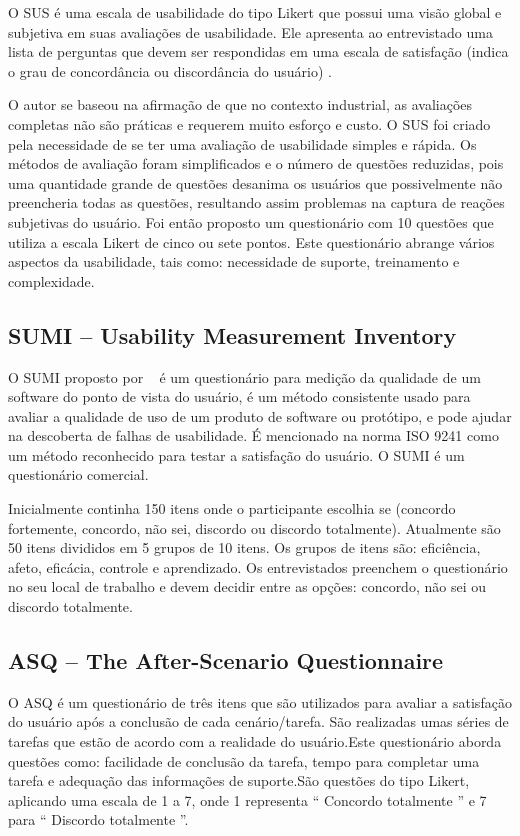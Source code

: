 	O SUS é uma escala de usabilidade do tipo Likert que possui uma visão global e subjetiva em suas avaliações de usabilidade. Ele apresenta ao entrevistado uma lista de perguntas que devem ser respondidas em uma escala de satisfação (indica o grau de concordância ou discordância do usuário) \cite{brooke1996sus}.

	O autor se baseou na afirmação de que no contexto industrial, as avaliações completas não são práticas e requerem muito esforço e custo. O SUS foi criado pela necessidade de se ter uma avaliação de usabilidade simples e rápida. Os métodos de avaliação foram simplificados e o número de questões reduzidas, pois uma quantidade grande de questões desanima os usuários que possivelmente não preencheria todas as questões, resultando assim problemas na captura de reações subjetivas do usuário. Foi então proposto um questionário com 10 questões que utiliza a escala Likert de cinco ou sete pontos. Este questionário abrange vários aspectos da usabilidade, tais como: necessidade de suporte, treinamento e complexidade. ~\cite{preece2007}

\subsection{SUMI – Usability Measurement Inventory}

	O SUMI proposto por ~ é um questionário para medição da qualidade de um software do ponto de vista do usuário, é um método consistente usado para avaliar a qualidade de uso de um produto de software ou protótipo, e pode ajudar na descoberta de falhas de usabilidade. É mencionado na norma ISO 9241 como um método reconhecido para testar a satisfação do usuário. O SUMI é um questionário comercial. 

	Inicialmente continha 150 itens onde o participante escolhia se (concordo fortemente, concordo, não sei, discordo ou discordo totalmente). Atualmente são 50 itens divididos em 5 grupos de 10 itens. Os grupos de itens são: eficiência, afeto, eficácia, controle e aprendizado. Os entrevistados preenchem o questionário no seu local de trabalho e devem decidir entre as opções: concordo, não sei ou discordo totalmente.

\subsection{ASQ – The After-Scenario Questionnaire}

O ASQ é um questionário de três itens que são utilizados para avaliar a satisfação do usuário após a conclusão de cada cenário/tarefa. São realizadas umas séries de tarefas que estão de acordo com a realidade do usuário.Este questionário aborda questões como: facilidade de conclusão da tarefa, tempo para completar uma tarefa e adequação das informações de suporte.São questões do tipo Likert, aplicando uma escala de 1 a 7, onde 1 representa “ Concordo totalmente ” e 7 para “ Discordo totalmente ”. ~\cite{lewis1995ibm}

